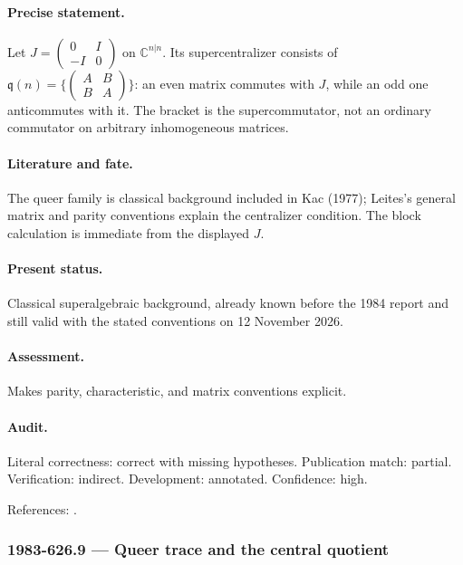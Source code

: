 \paragraph{Precise statement.} Let \(J=\begin{pmatrix}0&I\\-I&0\end{pmatrix}\) on \(\mathbb C^{n|n}\). Its supercentralizer consists of \(\mathfrak q(n)=\{\begin{pmatrix}A&B\\B&A\end{pmatrix}\}\): an even matrix commutes with \(J\), while an odd one anticommutes with it. The bracket is the supercommutator, not an ordinary commutator on arbitrary inhomogeneous matrices.

\paragraph{Literature and fate.} The queer family is classical background included in Kac (1977); Leites’s general matrix and parity conventions explain the centralizer condition. The block calculation is immediate from the displayed \(J\).

\paragraph{Present status.} Classical superalgebraic background, already known before the 1984 report and still valid with the stated conventions on 12 November 2026.

\paragraph{Assessment.} Makes parity, characteristic, and matrix conventions explicit.

\paragraph{Audit.} Literal correctness: correct with missing hypotheses. Publication match: partial. Verification: indirect. Development: annotated. Confidence: high.

\noindent References: \citep{kac1977sketch,leites1980introduction}.\par

\subsubsection{1983-626.9 --- Queer trace and the central quotient}

